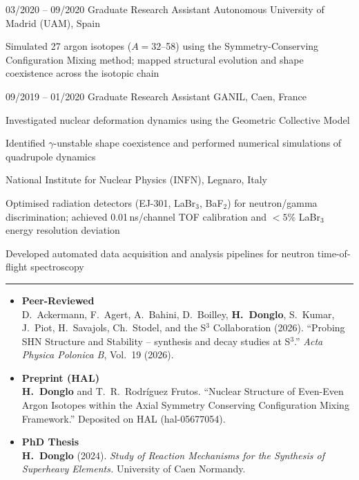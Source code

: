 \documentclass[10pt,a4paper]{article}
\newcommand{\cvsection}[1]{%
  \par\vspace{8pt}%
  \noindent{\large\bfseries\textcolor{maincolor}{#1}}\par
  {\color{maincolor}\rule{\linewidth}{0.6pt}}%
  \vspace{4pt}%
}
\begin{document}
\timelineitem
{03/2020 -- 09/2020 \quad Graduate Research Assistant}
{Autonomous University of Madrid (UAM), Spain}
{
  \item Simulated 27 argon isotopes ($A=32$--58) using the
        Symmetry-Conserving Configuration Mixing method; mapped
        structural evolution and shape coexistence across the
        isotopic chain
}

\timelineitem
{09/2019 -- 01/2020 \quad Graduate Research Assistant}
{GANIL, Caen, France}
{
  \item Investigated nuclear deformation dynamics using the
        Geometric Collective Model
  \item Identified $\gamma$-unstable shape coexistence and performed
        numerical simulations of quadrupole dynamics
}

{National Institute for Nuclear Physics (INFN), Legnaro, Italy}
{
  \item Optimised radiation detectors (EJ-301, LaBr$_3$, BaF$_2$)
        for neutron/gamma discrimination; achieved 0.01\,ns/channel
        TOF calibration and ${<}5\%$ LaBr$_3$ energy resolution
        deviation
  \item Developed automated data acquisition and analysis pipelines
        for neutron time-of-flight spectroscopy
}

\cvsection{Publications}

{\footnotesize
\begin{itemize}[leftmargin=1.4em, itemsep=6pt, topsep=2pt,
                label=\textbullet]

  \item \textbf{Peer-Reviewed}\\
  D.\ Ackermann, F.\ Agert, A.\ Bahini, D.\ Boilley, \textbf{H.\ Donglo},
  S.\ Kumar, J.\ Piot, H.\ Savajols, Ch.\ Stodel, and the S$^3$ Collaboration (2026).
  ``Probing SHN Structure and Stability -- synthesis and decay studies at S$^3$.''
  \textit{Acta Physica Polonica B}, Vol.\ 19 (2026).

  \item \textbf{Preprint (HAL)}\\
  \textbf{H.\ Donglo} and T.~R.\ Rodr\'iguez Frutos.
  ``Nuclear Structure of Even-Even Argon Isotopes within the Axial
  Symmetry Conserving Configuration Mixing Framework.''
  Deposited on HAL (hal-05677054).

  \item \textbf{PhD Thesis}\\
  \textbf{H.\ Donglo} (2024).
  \textit{Study of Reaction Mechanisms for the Synthesis of
  Superheavy Elements.}
  University of Caen Normandy.

\end{itemize}
}
\end{document}
